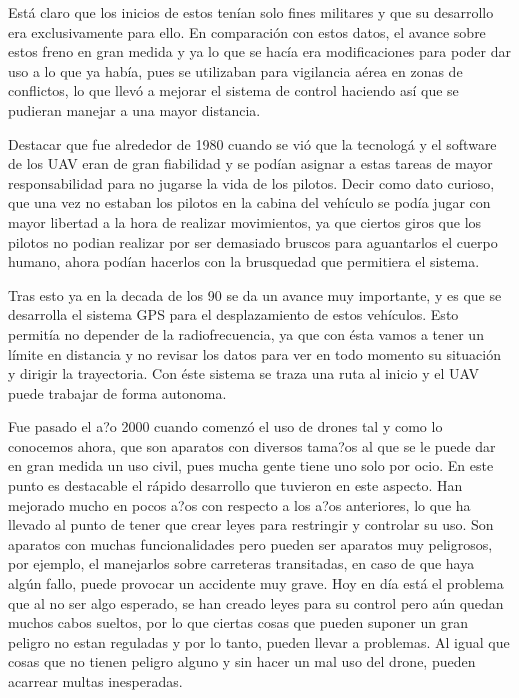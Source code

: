 \hspace{1 cm} Est\'a claro que los inicios de estos ten\'ian solo fines militares y que su desarrollo era exclusivamente para ello. En comparaci\'on con estos datos, el avance sobre estos freno en gran medida y ya lo que se hac\'ia era modificaciones para poder dar uso a lo que ya hab\'ia, pues se utilizaban para vigilancia a\'erea en zonas de conflictos, lo que llev\'o a mejorar el sistema de control haciendo as\'i que se pudieran manejar a una mayor distancia. 

\hspace{1 cm}Destacar que fue alrededor de 1980 cuando se vi\'o que la tecnolog\'a y el software de los UAV eran de gran fiabilidad y se pod\'ian asignar a estas tareas de mayor responsabilidad para no jugarse la vida de los pilotos. Decir como dato curioso, que una vez no estaban los pilotos en la cabina del veh\'iculo se pod\'ia jugar con mayor libertad a la hora de realizar movimientos, ya que ciertos giros que los pilotos no podian realizar por ser demasiado bruscos para aguantarlos el cuerpo humano, ahora pod\'ian hacerlos con la brusquedad que permitiera el sistema.  

\hspace{1 cm} Tras esto ya en la decada de los 90 se da un avance muy importante, y es que se desarrolla el sistema GPS para el desplazamiento de estos veh\'iculos. Esto permit\'ia no depender de la radiofrecuencia, ya que con \'esta vamos a tener un l\'imite en distancia y no revisar los datos para ver en todo momento su situaci\'on y dirigir la trayectoria. Con \'este sistema se traza una ruta al inicio y el UAV puede trabajar de forma autonoma. 

\hspace{1 cm} Fue pasado el a?o 2000 cuando comenz\'o el uso de drones tal y como lo conocemos ahora, que son aparatos con diversos tama?os al que se le puede dar en gran medida un uso civil, pues mucha gente tiene uno solo por ocio. En este punto es destacable el r\'apido desarrollo que tuvieron en este aspecto. Han mejorado mucho en pocos a?os con respecto a los a?os anteriores, lo que ha llevado al punto de tener que crear leyes para restringir y controlar su uso. Son aparatos con muchas funcionalidades pero pueden ser aparatos muy peligrosos, por ejemplo, el manejarlos sobre carreteras transitadas, en caso de que haya alg\'un fallo, puede provocar un accidente muy grave. Hoy en d\'ia est\'a el problema que al no ser algo esperado, se han creado leyes para su control pero a\'un quedan muchos cabos sueltos, por lo que ciertas cosas que pueden suponer un gran peligro no estan reguladas y por lo tanto, pueden llevar a problemas. Al igual que cosas que no tienen peligro alguno y sin hacer un mal uso del drone, pueden acarrear multas inesperadas.

